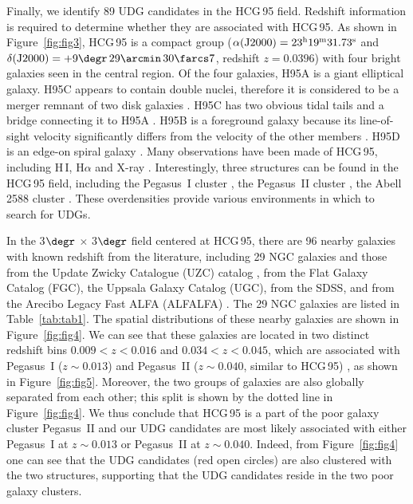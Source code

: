 \documentclass[twocolumn,trackchanges]{aastex61}
\begin{document}
Finally, we identify 89 UDG candidates in the HCG\,95 field. Redshift information is required to determine whether they are associated with HCG\,95. As shown in Figure~\ref{fig:fig3}, HCG\,95 is a compact group ($\alpha(\rm J2000) = 23^{h} 19^{m} 31.73^{s} $ and  $\delta(\rm J2000) = +9\degr\,29\arcmin\,30\farcs7$, redshift $z=0.0396$) with four bright galaxies seen in the central region. Of the four galaxies, H95A is a giant elliptical galaxy. H95C appears to contain double nuclei, therefore it is considered to be a merger remnant of two disk galaxies \citep{Iglesias-Paramo1997,Iglesias-Paramo1998}. H95C has two obvious tidal tails and a bridge connecting it to H95A \citep{Rodrigue1995}. H95B is a foreground galaxy because its line-of-sight velocity significantly differs from the velocity of the other members \citep{Iglesias-Paramo1997,DaRocha2005}. H95D is an edge-on spiral galaxy \citep{Iglesias-Paramo1997}. 
Many observations have been made of HCG\,95, including H\,{\small I}, H{\small$\alpha$} and X-ray \citep{Ponman1996,Iglesias-Paramo1998,Iglesias-Paramo2001,Huchtmeier2000,DaRocha2005}. Interestingly, three structures can be found  in the HCG\,95 field, including the Pegasus~I cluster \citep{Chincarini1976,O'Neil1997}, the Pegasus~II cluster \citep{Richter1982}, the Abell\,2588 cluster \citep{Richter1982,Abell1989}. These overdensities provide various environments in which to search for UDGs.

In the 3$\degr$   $\times$   3$\degr$ field centered at HCG\,95, there are 96 nearby galaxies with known redshift from the literature, including 29 NGC galaxies and those from the Update Zwicky Catalogue (UZC) catalog \citep{Falco1999}, from the Flat Galaxy Catalog (FGC), the Uppsala Galaxy Catalog (UGC), from the SDSS, and from the Arecibo Legacy Fast ALFA (ALFALFA) \citep{Haynes2011,Teimoorinia2017}. The 29 NGC galaxies are listed in Table~\ref{tab:tab1}. The spatial distributions of these nearby galaxies are shown in Figure~\ref{fig:fig4}. 
We can see that these galaxies are located in two distinct redshift bins $0.009<z<0.016$ and $0.034<z<0.045$, which are associated with Pegasus~I ($z\sim 0.013$) and Pegasus~II ($z\sim 0.040$, similar to HCG\,95) \citep{Richter1982,Canizares1986}, as shown in Figure~\ref{fig:fig5}. Moreover, the two groups of galaxies are also globally separated from each other; this split is shown by the dotted line in Figure~\ref{fig:fig4}. We thus conclude that HCG\,95 is a part of the poor galaxy cluster Pegasus~II and our UDG candidates are most likely associated with either Pegasus~I at $z\sim0.013$ or Pegasus~II at $z\sim 0.040$. 
%
Indeed,  from Figure~\ref{fig:fig4}  one can see that the UDG candidates (red open circles) are also clustered with the two structures, supporting that the UDG candidates reside in the two poor galaxy clusters. 
 
\end{document}
